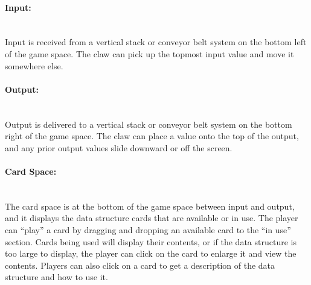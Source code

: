 \paragraph{Input:} ~\\
Input is received from a vertical stack or conveyor belt system on the bottom left of the game space.
The claw can pick up the topmost input value and move it somewhere else.\\

\paragraph{Output:} ~\\
Output is delivered to a vertical stack or conveyor belt system on the bottom right of the game space.
The claw can place a value onto the top of the output, and any prior output values slide downward 
or off the screen.\\

\paragraph{Card Space:} ~\\
The card space is at the bottom of the game space between input and output, and it displays the data 
structure cards that are available or in use. The player can ``play'' a card by dragging and dropping 
an available card to the ``in use'' section. Cards being used will display their contents, or if the data 
structure is too large to display, the player can click on the card to enlarge it and view the contents. 
Players can also click on a card to get a description of the data structure and how to use it.\\